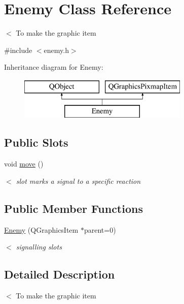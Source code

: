 \hypertarget{class_enemy}{}\section{Enemy Class Reference}
\label{class_enemy}


$<$ To make the graphic item  




{\ttfamily \#include $<$enemy.\+h$>$}

Inheritance diagram for Enemy\+:\begin{figure}[H]
\begin{center}
\leavevmode
\includegraphics[height=2.000000cm]{class_enemy}
\end{center}
\end{figure}
\subsection*{Public Slots}
\begin{DoxyCompactItemize}
\item 
void \hyperlink{class_enemy_a9a398f8d12234f02563b27440aff7891}{move} ()
\begin{DoxyCompactList}\small\item\em $<$ slot marks a signal to a specific reaction \end{DoxyCompactList}\end{DoxyCompactItemize}
\subsection*{Public Member Functions}
\begin{DoxyCompactItemize}
\item 
\hyperlink{class_enemy_ac98fc516847e643f8e528f4bb7cbfa35}{Enemy} (Q\+Graphics\+Item $\ast$parent=0)
\begin{DoxyCompactList}\small\item\em $<$ signalling slots \end{DoxyCompactList}\end{DoxyCompactItemize}


\subsection{Detailed Description}
$<$ To make the graphic item 

